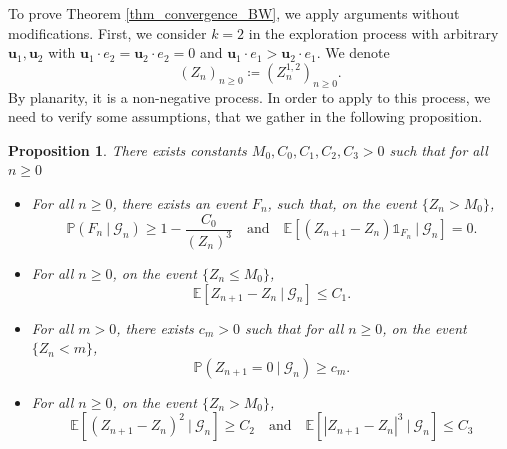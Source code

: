 \documentclass[a4paper, 11pt]{article}
\theoremstyle{plain}
\newtheorem{Proposition}[Theorem]{Proposition}
\theoremstyle{definition}
\newcommand{\E}{\mathbb{E}}
\renewcommand{\P}{\mathbb{P}}
\numberwithin{equation}{section}
\begin{document}
To prove Theorem \ref{thm_convergence_BW}, we apply \cite{Dsf2d} arguments without modifications. First, we consider $k=2$ in the exploration process with arbitrary $\mathbf u_1,\mathbf u_2$ with $\mathbf u_1\cdot e_2=\mathbf u_2\cdot e_2=0$ and $\mathbf u_1\cdot e_1>\mathbf u_2\cdot e_1$. We denote
    \[(Z_n)_{n\geq 0}\coloneqq (Z^{1, 2}_n)_{n\geq 0}.\]
By planarity, it is a non-negative process. In order to apply \cite[Corollary 5.6]{Dsf2d} to this process, we need to verify some assumptions, that we gather in the following proposition.

\begin{Proposition}
    \label{prop_assumption}
    There exists constants $M_0, C_0, C_1, C_2, C_3>0$ such that for all $n\geq 0$
    \begin{itemize}
        \item[(i)] For all $n\geq 0$, there exists an event $F_n$, such that, on the event $\{Z_n>M_0\}$,
            \[\P(F_n~|~\mathcal G_n)\geq 1-\frac{C_0}{(Z_n)^3}\quad\text{and}\quad\E[(Z_{n+1}-Z_n)\mathds 1_{F_n}~|~\mathcal G_n]=0.\]
        \item [(ii)] For all $n\geq 0$, on the event $\{Z_n\leq M_0\}$,
            \[\E[Z_{n+1}-Z_n~|~\mathcal G_n]\leq C_1.\]
        \item [(iii)] For all $m>0$, there exists $c_m>0$ such that for all $n\geq 0$, on the event $\{Z_n<m\}$,
            \[\P(Z_{n+1}=0~|~\mathcal G_n)\geq c_m.\]
        \item[(iv)] For all $n\geq 0$, on the event $\{Z_n>M_0\}$,
            \[\E[(Z_{n+1}-Z_n)^2~|~\mathcal G_n]\geq C_2\quad\text{and}\quad\E[|Z_{n+1}-Z_n|^3~|~\mathcal G_n]\leq C_3\]
    \end{itemize}
\end{Proposition}
\end{document}
